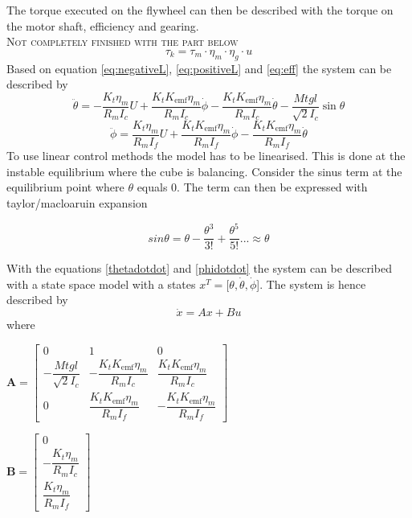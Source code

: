 \documentclass[a4paper,11pt]{kth-mag}
\begin{document}
The torque executed on the flywheel can then be described with the torque on the motor shaft, efficiency and gearing. \\ \textsc{Not completely finished with the part below}
\begin{equation} \label{eq:eff}
\tau_k = \tau_m \cdot \eta_m \cdot \eta_g \cdot u
\end{equation}
Based on equation \eqref{eq:negativeL}, \eqref{eq:positiveL} and \eqref{eq:eff} the system can be described by
\begin{equation}
\ddot{\theta} = -\frac{K_t \eta_m}{R_m I_c} U + \frac{K_t K_{\text{emf}} \eta_m}{R_m I_c} \dot{\phi} - \frac{K_t K_{\text{emf}} \eta_m}{R_m I_c} \dot{\theta} - \frac{Mt g l }{\sqrt{2} I_c} \sin \theta \label{thetadotdot}
\end{equation}
\begin{equation}
\ddot{\phi} = \frac{K_t \eta_m}{R_m I_f} U + \frac{K_t K_{\text{emf}} \eta_m}{R_m I_f} \dot{\phi} - \frac{K_t K_{\text{emf}} \eta_m}{R_m I_f} \dot{\theta} 
\label{phidotdot}
\end{equation} 
To use linear control methods the model has to be linearised. This is done at the instable equilibrium where the cube is balancing. Consider the sinus term at the equilibrium point where $\theta$ equals $0$. The term can then be expressed with taylor/macloaruin expansion

\begin{equation} \label{eq: sinus taylor}
sin \theta = \theta - \frac{\theta^3}{3!} +\frac{\theta^5}{5!}... \approx \theta 
\end{equation}

With the equations \eqref{thetadotdot} and \eqref{phidotdot} the system can be described with a state space model with a states $x^T = [\theta, \dot{\theta}, \dot{\phi}$]. The system is hence described by
\begin{equation}
\dot{x} = Ax + Bu
\end{equation} 
where \\
\begin{center}
$\textbf{A} =\begin{bmatrix}
0 & 1 & 0 \\
-\dfrac{Mt g l }{\sqrt{2} I_c} & - \dfrac{K_t K_{\text{emf}} \eta_m}{R_m I_c} & \dfrac{K_t K_{\text{emf}} \eta_m}{R_m I_c} \\ 
0 & \dfrac{K_t K_{\text{emf}} \eta_m}{R_m I_f} & -\dfrac{K_t K_{\text{emf}} \eta_m}{R_m I_f}
\end{bmatrix}$

$\textbf{B} = \begin{bmatrix}
0 \\ 
-\dfrac{K_t \eta_m}{R_m I_c} \\
\dfrac{K_t \eta_m}{R_m I_f}
\end{bmatrix} $
\end{center}
 
\end{document}
